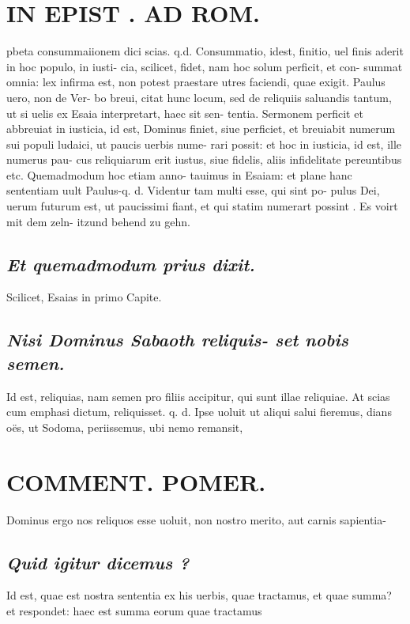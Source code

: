 \documentclass{article}
\begin{document}
\begin{pages}
\section*{IN EPIST . AD ROM.  }
\marginpar{[ p.115 ]}\pstart pbeta consummaiionem dici scias. q.d. Consummatio, idest, finitio, uel finis aderit in hoc populo, in iusti- cia, scilicet, fidet, nam hoc solum perficit, et con- summat omnia: lex infirma est, non potest praestare utres faciendi, quae exigit. Paulus uero, non de Ver- bo breui, citat hunc locum, sed de reliquiis saluandis tantum, ut si uelis ex Esaia interpretart, haec sit sen- tentia. Sermonem perficit et abbreuiat in iusticia, id est, Dominus finiet, siue perficiet, et breuiabit numerum sui populi ludaici, ut paucis uerbis nume- rari possit: et hoc in iusticia, id est, ille numerus pau- cus reliquiarum erit iustus, siue fidelis, aliis infidelitate pereuntibus etc. Quemadmodum hoc etiam anno- tauimus in Esaiam: et plane hanc sententiam uult Paulus-q. d. Videntur tam multi esse, qui sint po- pulus Dei, uerum futurum est, ut paucissimi fiant, et qui statim numerart possint . Es voirt mit dem zeln- itzund behend zu gehn.  \pend
{}
{}
\subsection*{\textit{Et quemadmodum prius dixit. }}\pstart Scilicet, Esaias in primo Capite.  \pend
{}
{}
\subsection*{\textit{Nisi Dominus Sabaoth reliquis- set nobis semen. }}\pstart Id est, reliquias, nam semen pro filiis accipitur, qui sunt illae reliquiae. At scias cum emphasi dictum, reliquisset. q. d. Ipse uoluit ut aliqui salui fieremus, dians oës, ut Sodoma, periissemus, ubi nemo remansit,  \pend
\section*{COMMENT. POMER.  }\pstart Dominus ergo nos reliquos esse uoluit, non nostro merito, aut carnis sapientia-  \pend
{}
{}
\subsection*{\textit{Quid igitur dicemus ? }}\pstart Id est, quae est nostra sententia ex his uerbis, quae tractamus, et quae summa? et respondet: haec est summa eorum quae tractamus  \pend
{}
{}

\end{pages}
\end{document}
